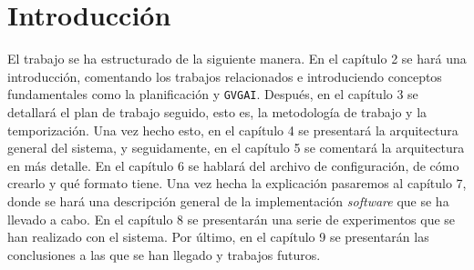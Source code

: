 
\chapter{Introducción}

El trabajo se ha estructurado de la siguiente manera. En el capítulo 2 se hará
una introducción, comentando los trabajos relacionados e introduciendo conceptos
fundamentales como la planificación y \texttt{GVGAI}. Después, en el capítulo 3 se detallará
el plan de trabajo seguido, esto es, la metodología de trabajo y la temporización.
Una vez hecho esto, en el capítulo 4 se presentará la arquitectura general del sistema,
y seguidamente, en el capítulo 5 se comentará la arquitectura en más detalle.
En el capítulo 6 se hablará del archivo de configuración, de cómo crearlo y qué
formato tiene. Una vez hecha la explicación pasaremos al capítulo 7, donde se hará
una descripción general de la implementación \textit{software} que se ha llevado a cabo.
En el capítulo 8 se presentarán una serie de experimentos que se han realizado con el sistema.
Por último, en el capítulo 9 se presentarán las conclusiones a las que
se han llegado y trabajos futuros.